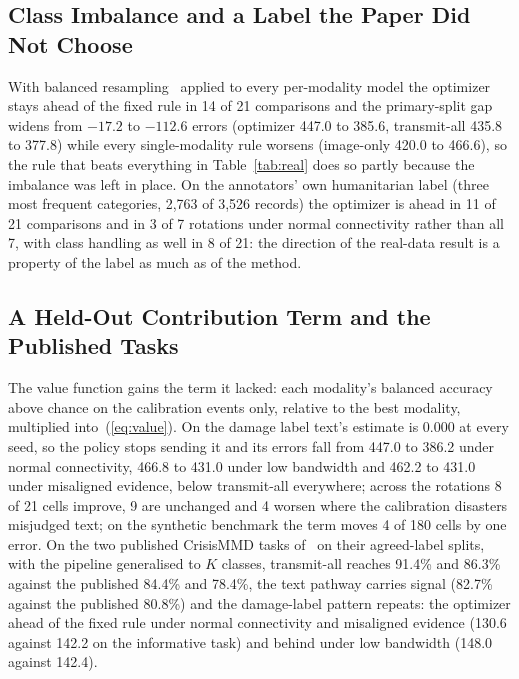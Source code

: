 \subsection{Class Imbalance and a Label the Paper Did Not Choose}
\label{sec:reallabel}
With balanced resampling~\cite{imbalance} applied to every per-modality model the optimizer stays ahead of the fixed rule in 14 of 21 comparisons and the primary-split gap widens from $-17.2$ to $-112.6$ errors (optimizer 447.0 to 385.6, transmit-all 435.8 to 377.8) while every single-modality rule worsens (image-only 420.0 to 466.6), so the rule that beats everything in Table~\ref{tab:real} does so partly because the imbalance was left in place. On the annotators' own humanitarian label (three most frequent categories, 2,763 of 3,526 records) the optimizer is ahead in 11 of 21 comparisons and in 3 of 7 rotations under normal connectivity rather than all 7, with class handling as well in 8 of 21: the direction of the real-data result is a property of the label as much as of the method.

\subsection{A Held-Out Contribution Term and the Published Tasks}
\label{sec:pcterm}
The value function gains the term it lacked: each modality's balanced accuracy above chance on the calibration events only, relative to the best modality, multiplied into~(\ref{eq:value}). On the damage label text's estimate is 0.000 at every seed, so the policy stops sending it and its errors fall from 447.0 to 386.2 under normal connectivity, 466.8 to 431.0 under low bandwidth and 462.2 to 431.0 under misaligned evidence, below transmit-all everywhere; across the rotations 8 of 21 cells improve, 9 are unchanged and 4 worsen where the calibration disasters misjudged text; on the synthetic benchmark the term moves 4 of 180 cells by one error. On the two published CrisisMMD tasks of~\cite{ofli2020} on their agreed-label splits, with the pipeline generalised to $K$ classes, transmit-all reaches 91.4\% and 86.3\% against the published 84.4\% and 78.4\%, the text pathway carries signal (82.7\% against the published 80.8\%) and the damage-label pattern repeats: the optimizer ahead of the fixed rule under normal connectivity and misaligned evidence (130.6 against 142.2 on the informative task) and behind under low bandwidth (148.0 against 142.4).

